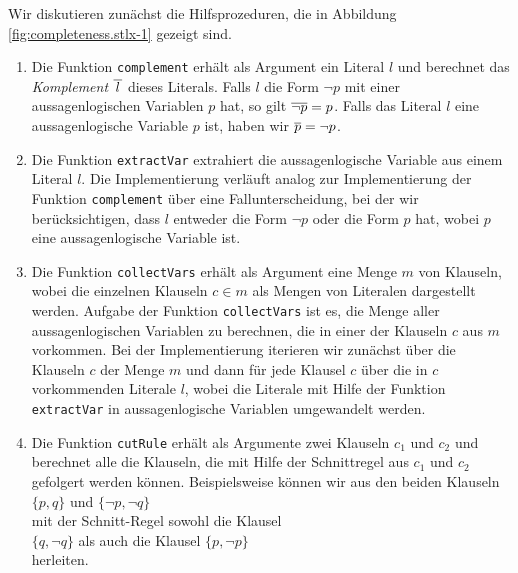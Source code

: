 Wir diskutieren zun\"{a}chst die Hilfsprozeduren, die in Abbildung \ref{fig:completeness.stlx-1} gezeigt
sind. 
\begin{enumerate}
\item Die Funktion \texttt{complement} erh\"{a}lt als Argument ein Literal $l$ und berechnet das
      \emph{Komplement} $\overline{\,l\,}$ dieses Literals.  Falls $l$ die Form $\neg p$ mit einer
      aussagenlogischen Variablen $p$ hat, so gilt $\overline{\neg p} = p$.   Falls das Literal
      $l$ eine aussagenlogische Variable $p$ ist, haben wir $\overline{p} = \neg p$.
\item Die Funktion \texttt{extractVar} extrahiert die aussagenlogische Variable aus einem Literal $l$.
      Die Implementierung verl\"{a}uft analog zur Implementierung der Funktion \texttt{complement} \"{u}ber eine
      Fallunterscheidung, bei der wir ber\"{u}cksichtigen, dass $l$ entweder die Form $\neg p$ oder die
      Form $p$ hat, wobei $p$ eine aussagenlogische Variable ist.
\item Die Funktion \texttt{collectVars} erh\"{a}lt als Argument eine Menge $m$ von Klauseln, wobei die
      einzelnen Klauseln $c \in m$ als Mengen von Literalen dargestellt werden.  Aufgabe der
      Funktion \texttt{collectVars} ist es, die Menge aller aussagenlogischen Variablen zu
      berechnen, die in einer der Klauseln $c$ aus $m$ vorkommen.  Bei der Implementierung iterieren
      wir zun\"{a}chst \"{u}ber die Klauseln $c$ der Menge $m$ und dann f\"{u}r jede Klausel $c$ \"{u}ber die in $c$
      vorkommenden Literale $l$, wobei die Literale mit Hilfe der Funktion \texttt{extractVar} in
      aussagenlogische Variablen umgewandelt werden.
\item Die Funktion \texttt{cutRule} erh\"{a}lt als Argumente zwei Klauseln $c_1$ und $c_2$ und berechnet
      alle die Klauseln, die mit Hilfe der Schnittregel aus $c_1$ und $c_2$ gefolgert werden
      k\"{o}nnen.  Beispielsweise k\"{o}nnen wir aus den beiden Klauseln
      \\[0.2cm]
      \hspace*{1.3cm}
      $\{ p, q \}$ \quad und \quad $\{ \neg p, \neg q \}$ 
      \\[0.2cm]
      mit der Schnitt-Regel sowohl die Klausel
      \\[0.2cm]
      \hspace*{1.3cm}
      $\{q, \neg q\}$ \quad als auch die Klausel \quad $\{p, \neg p \}$
      \\[0.2cm]
      herleiten.
\end{enumerate}

